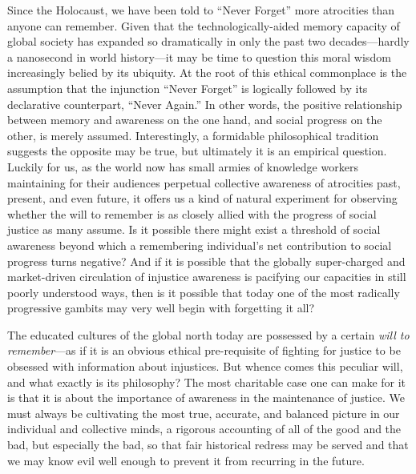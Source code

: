 \documentclass[a4paper,12pt,margin=.5in]{article}
\begin{document}
Since the Holocaust, we have been told to ``Never Forget'' more
atrocities than anyone can remember. Given that the
technologically-aided memory capacity of global society has expanded so
dramatically in only the past two decades---hardly a nanosecond in world
history---it may be time to question this moral wisdom increasingly
belied by its ubiquity. At the root of this ethical commonplace is the
assumption that the injunction ``Never Forget'' is logically followed by
its declarative counterpart, ``Never Again.'' In other words, the
positive relationship between memory and awareness on the one hand, and
social progress on the other, is merely assumed. Interestingly, a
formidable philosophical tradition suggests the opposite may be true,
but ultimately it is an empirical question. Luckily for us, as the world
now has small armies of knowledge workers maintaining for their
audiences perpetual collective awareness of atrocities past, present,
and even future, it offers us a kind of natural experiment for observing
whether the will to remember is as closely allied with the progress of
social justice as many assume. Is it possible there might exist a
threshold of social awareness beyond which a remembering individual's
net contribution to social progress turns negative? And if it is
possible that the globally super-charged and market-driven circulation
of injustice awareness is pacifying our capacities in still poorly
understood ways, then is it possible that today one of the most
radically progressive gambits may very well begin with forgetting it
all?

The educated cultures of the global north today are possessed by a
certain \emph{will to remember}---as if it is an obvious ethical
pre-requisite of fighting for justice to be obsessed with information
about injustices. But whence comes this peculiar will, and what exactly
is its philosophy? The most charitable case one can make for it is that
it is about the importance of awareness in the maintenance of justice.
We must always be cultivating the most true, accurate, and balanced
picture in our individual and collective minds, a rigorous accounting of
all of the good and the bad, but especially the bad, so that fair
historical redress may be served and that we may know evil well enough
to prevent it from recurring in the future.
\end{document}
